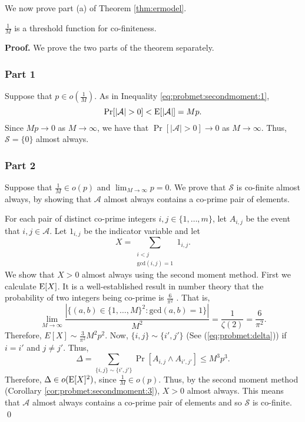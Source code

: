 We now prove part (a) of Theorem \ref{thm:ermodel}.

\begin{theorem}\label{thm:ermodel:co-finite}
     $\frac{1}{M}$ is a threshold function for co-finiteness.
\end{theorem}

\textbf{Proof. } We prove the two parts of the theorem separately. 
\subsubsection*{Part 1}
Suppose that $p \in o\left(\frac{1}{M}\right)$. As in Inequality \ref{eq:probmet:secondmoment:1}, 
\[\mathrm{Pr}[|\mathcal{A}| > 0] < \mathrm{E}[|\mathcal{A}|] = Mp.\]
Since $Mp \to 0$ as $M \to \infty$, we have that $\Pr[|\mathcal{A}| > 0] \to 0$ as $M \to \infty$. Thus, $\mathcal{S} = \{0\}$ almost always. \par

\subsubsection*{Part 2}
Suppose that $\frac{1}{M} \in o(p)$ and $\lim_{M \to \infty} p = 0$. We prove that $\mathcal{S}$ is co-finite almost always, by showing that $\mathcal{A}$ almost always contains a co-prime pair of elements. \par
For each pair of distinct co-prime integers $i, j \in \{1,\ldots, m\}$, let $A_{i, j}$ be the event that $i, j \in \mathcal{A}$. Let $1_{i, j}$ be the indicator variable and let 
\[X = \sum_{\substack{i < j \\ \mathrm{gcd}(i, j) = 1}} 1_{i, j}.\]
We show that $X > 0$ almost always using the second moment method. First we calculate $\mathrm{E}[X]$. It is a well-established result in number theory that the probability of two integers being co-prime is $\frac{6}{\pi^2}$ \cite[Theorem 332]{hardy1979introduction}. That is,
\[\lim_{M \to \infty} \frac{|\{(a, b) \in \{1, \ldots, M\}^2: \mathrm{gcd}(a, b) = 1\}|}{M^2} = \frac{1}{\zeta(2)} =\frac{6}{\pi^2}.\]
Therefore, $E[X] \sim \frac{3}{\pi^2}M^2p^2$. Now, $\{i, j\} \sim \{i', j'\}$ (See (\ref{eq:probmet:delta})) if $i = i'$ and $j \neq j'$. Thus,
\[\Delta = \sum_{\{i, j\} \sim \{i', j'\}}\Pr[A_{i, j}\land A_{i', j'}] \leq M^3p^3.\]
Therefore, $\Delta \in o(\mathrm{E}[X]^2)$, since $\frac{1}{M} \in o(p)$. Thus, by the second moment method (Corollary \ref{cor:probmet:secondmoment:3}), $X > 0$ almost always. This means that $\mathcal{A}$ almost always contains a co-prime pair of elements and so $\mathcal{S}$ is co-finite. \qed \par

